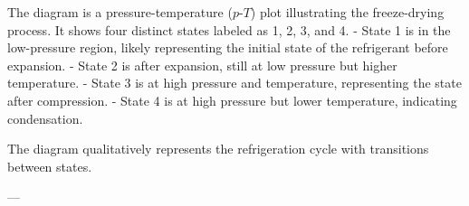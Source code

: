 The diagram is a pressure-temperature (\(p\)-\(T\)) plot illustrating the freeze-drying process. It shows four distinct states labeled as 1, 2, 3, and 4.  
- State 1 is in the low-pressure region, likely representing the initial state of the refrigerant before expansion.  
- State 2 is after expansion, still at low pressure but higher temperature.  
- State 3 is at high pressure and temperature, representing the state after compression.  
- State 4 is at high pressure but lower temperature, indicating condensation.  

The diagram qualitatively represents the refrigeration cycle with transitions between states.

---